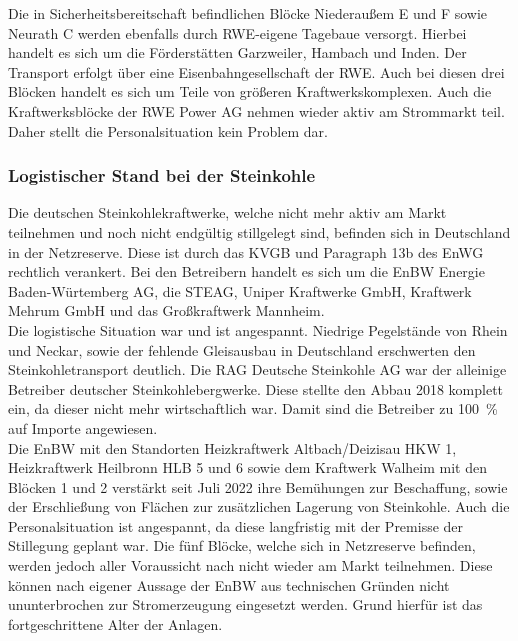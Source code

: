 	Die in Sicherheitsbereitschaft befindlichen Blöcke Niederaußem E und F sowie Neurath C werden ebenfalls durch RWE-eigene Tagebaue versorgt. Hierbei handelt es sich um die Förderstätten Garzweiler, Hambach und Inden. Der Transport erfolgt über eine Eisenbahngesellschaft der RWE. Auch bei diesen drei Blöcken handelt es sich um Teile von größeren Kraftwerkskomplexen. Auch die Kraftwerksblöcke der RWE Power AG nehmen wieder aktiv am Strommarkt teil.  Daher stellt die Personalsituation kein Problem dar. \cite{Mail_RWE}
	
	\subsubsection{Logistischer Stand bei der Steinkohle} \label{sect: Steinkohle}
	Die deutschen Steinkohlekraftwerke, welche nicht mehr aktiv am Markt teilnehmen und noch nicht endgültig stillgelegt sind, befinden sich in Deutschland in der Netzreserve. Diese ist durch das KVGB und Paragraph 13b des EnWG rechtlich verankert. Bei den Betreibern handelt es sich um die EnBW Energie Baden-Würtemberg AG, die STEAG, Uniper Kraftwerke GmbH, Kraftwerk Mehrum GmbH und das Großkraftwerk Mannheim.\cite{Excel_Kraftwerksliste} \\
	
	Die logistische Situation war und ist angespannt. Niedrige Pegelstände von Rhein und Neckar, sowie der fehlende Gleisausbau in Deutschland erschwerten den Steinkohletransport deutlich. Die RAG Deutsche Steinkohle AG war der alleinige Betreiber deutscher Steinkohlebergwerke. Diese stellte den Abbau 2018 komplett ein, da dieser nicht mehr wirtschaftlich war. Damit sind die Betreiber zu \SI{100}{\percent} auf Importe angewiesen.\cite{Ende_Steinkohle}\\
	
	Die EnBW mit den Standorten Heizkraftwerk Altbach/Deizisau HKW 1, Heizkraftwerk Heilbronn HLB 5 und 6 sowie dem Kraftwerk Walheim mit den Blöcken 1 und 2 verstärkt seit Juli 2022 ihre Bemühungen zur Beschaffung, sowie der Erschließung von Flächen zur zusätzlichen Lagerung von Steinkohle. Auch die Personalsituation ist angespannt, da diese langfristig mit der Premisse der Stillegung geplant war. Die fünf Blöcke, welche sich in Netzreserve befinden, werden jedoch aller Voraussicht nach nicht wieder am Markt teilnehmen. Diese können nach eigener Aussage der EnBW aus technischen Gründen nicht ununterbrochen zur Stromerzeugung eingesetzt werden. Grund hierfür ist das fortgeschrittene Alter der Anlagen.\cite{EnBW_Steinkohle} \\
	
